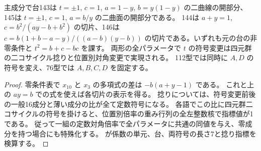 \begin{corollary}
主成分で台143は $t=\pm1$, $c=1$, $a=1-y$, $b=y(1-y)$ の二曲線の開部分、
145は $t=\pm1$, $c=1$, $a=b/y$ の二曲面の開部分である。
144は $a+y=1$, $c=b^2/(ay-b+b^2)$ の切片、146は
$c=b(1+b-a-y)/((a-b)(y-b))$ の切片である。いずれも元の台の非零条件と $t^2=b+c-bc$ を課す。
両形の全パラメータで $t$ の符号変更は四元群の二コサイクル捻りと位置別対角変更で実現される。
112型では同時に $A,D$ の符号を変え、76型では $A,B,C,D$ を固定する。
\end{corollary}
\begin{proof}
零条件表で $x_{10}$ と $x_3$ の多項式の差は $-b(a+y-1)$ である。
これと上の $ay=b$ での式を使えば各切片の表示を得る。
捻りについては、符号変更前後の一般16成分と薄い成分の比が全て定数符号になる。
各語でこの比に四元群二コサイクルの符号を掛けると、位置別倍率の重み行列の全左整数核で指標値が1である。
従って一組の定数対角倍率で全パラメータに共通の同値を与え、零成分を持つ場合にも特殊化する。
 が係数の単元、台、両符号の長さ7と捻り指標を検算する。
\end{proof}
